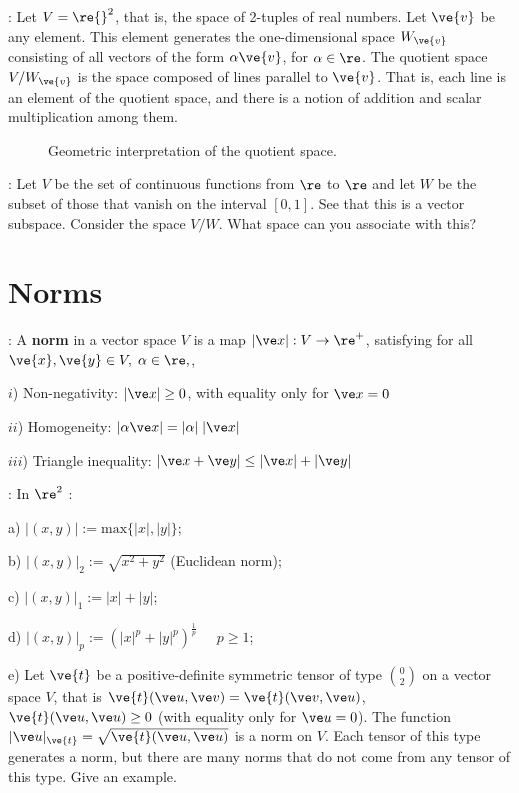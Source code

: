 \ejem: Let $V = \re{}^2$, that is, the space of 2-tuples of real numbers. Let $\ve{v}$ be any element. This element generates the one-dimensional space $W_{\ve{v}}$ consisting of all vectors of the form $\alpha \ve{v}$, for $\alpha \in \re$. The quotient space $V/W_{\ve{v}}$ is the space composed of lines parallel to $\ve{v}$. That is, each line is an element of the quotient space, and there is a notion of addition and scalar multiplication among them.

\begin{figure}[htbp] \begin{center}  \caption{Geometric interpretation of the quotient space.} \label{fig:2_1} \end{center} \end{figure}

\ejer: Let $V$ be the set of continuous functions from $\re$ to $\re$ and let $W$ be the subset of those that vanish on the interval $[0,1]$. See that this is a vector subspace. Consider the space $V/W$. What space can you associate with this?

\section{Norms}

: A {\bf norm} in a vector space $V$ is a map $|\ve x|:V\to \re^+$, satisfying for all $\ve{x},\ve{y} \in V,\;\alpha\in \re,$,

$i$) Non-negativity: $|\ve x|\geq 0$, with equality only for $\ve x=0$

$ii$) Homogeneity: $|\alpha \ve x| =| \alpha|\;|\ve x|$

$iii$) Triangle inequality: $|\ve x+\ve y|\leq|\ve x|+|\ve y|$

\noi{}: In $\re^2$ :

\noi a) $|(x,y)|:= \text{max}\{|x|,|y|\}$;

\noi b) $|(x,y)|_{2}:=\sqrt{x^2+y^2}$ (Euclidean norm);

\noi c) $|(x,y)|_{1}:=|x| +|y|$;

\noi d) $|(x,y)|_{p}:=(|x|^{p} + |y|^{p})^{\frac{1}{p}} \;\;\;\;\; p\geq 1$;

\noi e) Let $\ve{t}$ be a positive-definite symmetric tensor of type ${0 \choose 2}$ on a vector space $V$, that is $\ve{t}(\ve u,\ve v)=\ve{t}(\ve v,\ve u)$, $\ve{t}(\ve u,\ve u)\geq 0$ (with equality only for $\ve u=0$). The function $|\ve u|_{\ve{t}} =\sqrt{\ve{t}(\ve u,\ve u)}$ is a norm on $V$. Each tensor of this type generates a norm, but there are many norms that do not come from any tensor of this type. Give an example.

